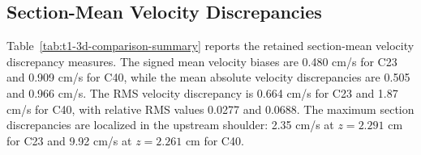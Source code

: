 \begin{table}[!htb]
    \centering
    \scriptsize
    \caption{Section-wise decomposition of the mean-velocity discrepancy into
    physical-flow and area-denominator contributions. Values are in cm/s and are
    reconstructed from the tracked section-quadrature report asset. The split is
    bookkeeping, not a causal attribution.}
    \label{tab:t1-flow-area-decomposition}
\end{table}

\subsection{Section-Mean Velocity Discrepancies}
\label{subsec:section-mean-velocity-discrepancies}

Table~\ref{tab:t1-3d-comparison-summary} reports the retained section-mean
velocity discrepancy measures. The signed mean velocity biases are 0.480 cm/s
for C23 and 0.909 cm/s for C40, while the mean absolute velocity discrepancies
are 0.505 and 0.966 cm/s. The RMS velocity discrepancy is 0.664 cm/s for C23
and 1.87 cm/s for C40, with relative RMS values 0.0277 and 0.0688. The maximum
section discrepancies are localized in the upstream shoulder: 2.35 cm/s at
$z=2.291$ cm for C23 and 9.92 cm/s at $z=2.261$ cm for C40.

